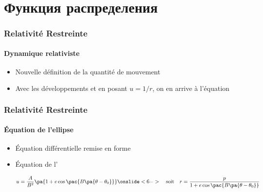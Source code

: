 \section{Функция распределения}

\begin{frame}
\frametitle{Relativité Restreinte}
\framesubtitle{Dynamique relativiste}

\begin{itemize}
	\item	<1->	Nouvelle définition de la quantité de mouvement
	
	
	\item	<3->	Avec les développements  et en posant 
	$u=1/r$, on en arrive à l'équation
	
	
	
\end{itemize}

\end{frame}


\begin{frame}
\frametitle{Relativité Restreinte}
\framesubtitle{Équation de l'ellipse}

\begin{itemize}
	\item	<1->	Équation différentielle remise en forme
	
	
	\item	<4->	Équation de l'
	
	$$
	u = \frac{A}{B^2} \pa{1 + e\cos{\pac{B\pa{\theta - \theta_0}}}}
	\onslide <6->
	\quad\text{soit}\quad
	r = \frac{p}{1+e\cos{\pac{B\pa{\theta - \theta_0}}}}
	$$
	
\end{itemize}

\end{frame}

